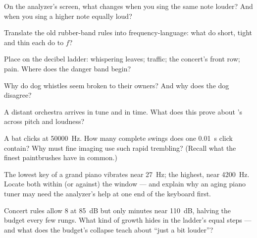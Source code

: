 \begin{exercise}[$\star$]\label{exo:g8:sound-pitch-loudness:4}
On the analyzer's screen, what changes when you sing the
same note louder? And when you sing a higher note equally
loud?
\end{exercise}

\begin{exercise}[$\star$]\label{exo:g8:sound-pitch-loudness:5}
Translate the old rubber-band rules into frequency-language:
what do short, tight and thin each do to $f$?
\end{exercise}

\begin{exercise}[$\star$]\label{exo:g8:sound-pitch-loudness:6}
Place on the decibel ladder: whispering leaves; traffic; the
concert's front row; pain. Where does the danger band
begin?
\end{exercise}

\begin{exercise}[$\star$]\label{exo:g8:sound-pitch-loudness:7}
Why do dog whistles seem broken to their owners? And why
does the dog disagree?
\end{exercise}

\begin{exercise}[$\star$]\label{exo:g8:sound-pitch-loudness:8}
A distant orchestra arrives in tune and in time. What does
this prove about 's  across pitch and loudness?
\end{exercise}

\begin{exercise}[$\star\star$]\label{exo:g8:sound-pitch-loudness:9}
A bat clicks at \qty{50000}{Hz}. How many complete swings
does one \qty{0.01}{s} click contain? Why must fine 
imaging use such rapid trembling? (Recall what the finest
paintbrushes have in common.)
\end{exercise}

\begin{exercise}[$\star\star$]\label{exo:g8:sound-pitch-loudness:10}
The lowest key of a grand piano vibrates near \qty{27}{Hz};
the highest, near \qty{4200}{Hz}. Locate both within (or
against) the  window --- and explain why an aging
piano tuner may need the analyzer's help at one end of the
keyboard first.
\end{exercise}

\begin{exercise}[$\star\star$]\label{exo:g8:sound-pitch-loudness:11}
Concert rules allow $8$  at \qty{85}{dB} but only
minutes near \qty{110}{dB}, halving the budget every few
rungs. What kind of growth hides in the ladder's equal
steps --- and what does the budget's collapse teach about
``just a bit louder''?
\end{exercise}

